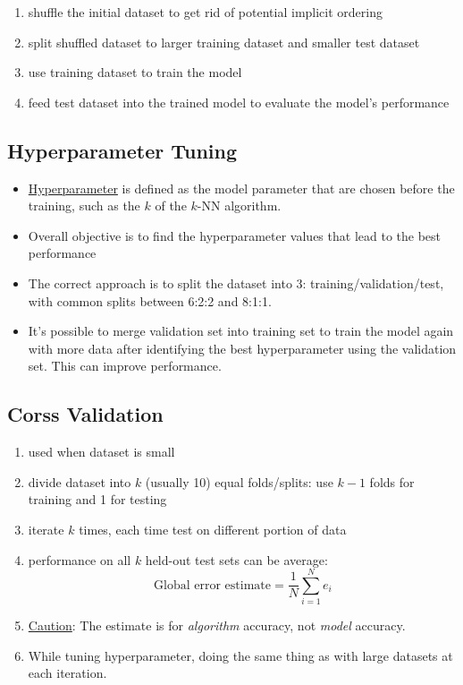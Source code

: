 \documentclass[twocolumn,landscape,10pt]{article}
\theoremstyle{definition}
\begin{document}
\begin{enumerate}
    \item shuffle the initial dataset to get rid of potential implicit ordering
    \item split shuffled dataset to larger training dataset and smaller test
        dataset
    \item use training dataset to train the model
    \item feed test dataset into the trained model to evaluate the model's performance
\end{enumerate} 

\subsection{Hyperparameter Tuning}

\begin{itemize}
    \item \underline{Hyperparameter} is defined as the model parameter that are
        chosen before the training, such as the $k$ of the $k$-NN algorithm.
    \item Overall objective is to find the hyperparameter values that lead to
        the best performance
    \item The correct approach is to split the dataset into 3:
        training/validation/test, with common splits between 6:2:2 and 8:1:1.
    \item It's possible to merge validation set into training set to train the
        model again with more data after identifying the best hyperparameter
        using the validation set. This can improve performance.
\end{itemize} 

\subsection{Corss Validation}

\begin{enumerate}
    \item used when dataset is small
    \item divide dataset into $k$ (usually 10) equal folds/splits: use $k-1$
        folds for training and 1 for testing
    \item iterate $k$ times, each time test on different portion of data
    \item performance on all $k$ held-out test sets can be average:
        \[
            \text{Global error estimate} = \frac{1}{N}\sum_{i=1}^{N} e_i
        \]
    \item \underline{Caution}: The estimate is for \emph{algorithm} accuracy,
        not \emph{model} accuracy.
    \item While tuning hyperparameter, doing the same thing as with large
        datasets at each iteration.
\end{enumerate} 
\end{document}
